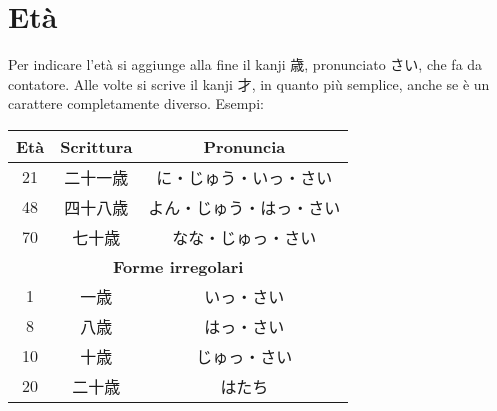 \documentclass{article}
\let\ita\textitalian
\newcommand{\itabf}[1]{\ita{\textbf{#1}}}
\newenvironment{tabJap}{\begin{center}\begin{japanese}\begin{longtable}{|c|c|c|}}{\end{longtable}\end{japanese}\end{center}}
\begin{document}
    \section{Età}

        Per indicare l'età si aggiunge alla fine il kanji \textjapanese{歳}, pronunciato \textjapanese{さい}, che fa
        da contatore. Alle volte si scrive il kanji \textjapanese{才}, in quanto più semplice, anche se è un carattere
        completamente diverso. Esempi:

        \begin{tabJap}
            \hline
            \itabf{Età} & \itabf{Scrittura} & \itabf{Pronuncia}\\
            \hline\hline
            21 & 二十一歳 & に・じゅう・いっ・さい\\
            \hline
            48 & 四十八歳 & よん・じゅう・はっ・さい\\
            \hline
            70 & 七十歳 & なな・じゅっ・さい\\
            \hline\hline
            \multicolumn{3}{|c|}{\itabf{Forme irregolari}}\\
            \hline\hline
            1 & 一歳 & いっ・さい\\
            \hline
            8 & 八歳 & はっ・さい\\
            \hline
            10 & 十歳 & じゅっ・さい\\
            \hline
            20 & 二十歳 & はたち\\
            \hline
        \end{tabJap}
        
\end{document}
